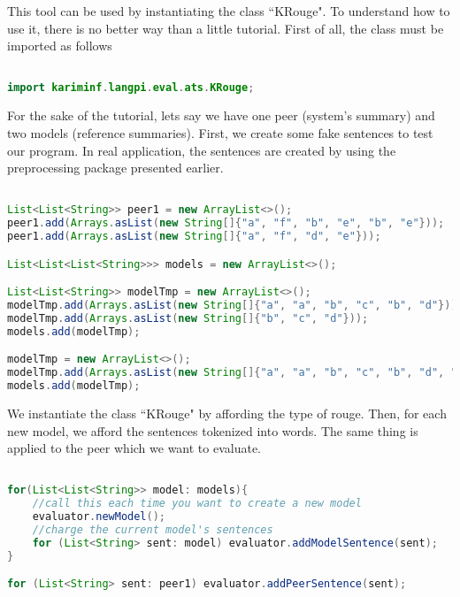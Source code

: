 This tool can be used by instantiating the class ``KRouge". 
To understand how to use it, there is no better way than a little tutorial. 
First of all, the class must be imported as follows 

\begin{lstlisting}[language={Java}, style=codeStyle] 

import kariminf.langpi.eval.ats.KRouge;

\end{lstlisting}

For the sake of the tutorial, lets say we have one peer (system's summary) and two models (reference summaries). 
First, we create some fake sentences to test our program.
In real application, the sentences are created by using the preprocessing package presented earlier. 

\begin{lstlisting}[language={Java}, style=codeStyle]

List<List<String>> peer1 = new ArrayList<>();
peer1.add(Arrays.asList(new String[]{"a", "f", "b", "e", "b", "e"}));
peer1.add(Arrays.asList(new String[]{"a", "f", "d", "e"}));

List<List<List<String>>> models = new ArrayList<>();

List<List<String>> modelTmp = new ArrayList<>();
modelTmp.add(Arrays.asList(new String[]{"a", "a", "b", "c", "b", "d"}));
modelTmp.add(Arrays.asList(new String[]{"b", "c", "d"}));
models.add(modelTmp);

modelTmp = new ArrayList<>();
modelTmp.add(Arrays.asList(new String[]{"a", "a", "b", "c", "b", "d", "a", "b"}));
models.add(modelTmp);

\end{lstlisting}

We instantiate the class ``KRouge" by affording the type of \ac{rouge}.
Then, for each new model, we afford the sentences tokenized into words. 
The same thing is applied to the peer which we want to evaluate.

\begin{lstlisting}[language={Java}, style=codeStyle]

for(List<List<String>> model: models){
	//call this each time you want to create a new model
	evaluator.newModel();
	//charge the current model's sentences
	for (List<String> sent: model) evaluator.addModelSentence(sent);
}

for (List<String> sent: peer1) evaluator.addPeerSentence(sent);
\end{lstlisting}

